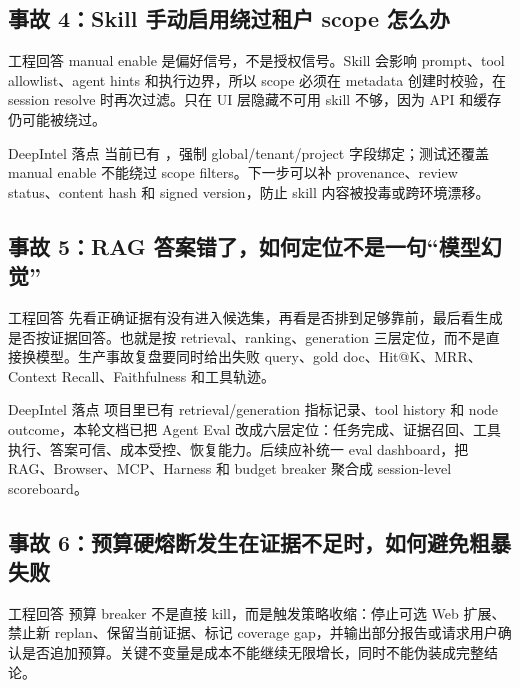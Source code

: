 \subsection{事故 4：Skill 手动启用绕过租户 scope 怎么办}
\begin{qaBox}{工程回答}
manual enable 是偏好信号，不是授权信号。Skill 会影响 prompt、tool allowlist、agent hints 和执行边界，所以 scope 必须在 metadata 创建时校验，在 session resolve 时再次过滤。只在 UI 层隐藏不可用 skill 不够，因为 API 和缓存仍可能被绕过。
\end{qaBox}

\begin{analysisBox}{DeepIntel 落点}
当前已有 ，强制 global/tenant/project 字段绑定；测试还覆盖 manual enable 不能绕过 scope filters。下一步可以补 provenance、review status、content hash 和 signed version，防止 skill 内容被投毒或跨环境漂移。
\end{analysisBox}

\subsection{事故 5：RAG 答案错了，如何定位不是一句“模型幻觉”}
\begin{qaBox}{工程回答}
先看正确证据有没有进入候选集，再看是否排到足够靠前，最后看生成是否按证据回答。也就是按 retrieval、ranking、generation 三层定位，而不是直接换模型。生产事故复盘要同时给出失败 query、gold doc、Hit@K、MRR、Context Recall、Faithfulness 和工具轨迹。
\end{qaBox}

\begin{analysisBox}{DeepIntel 落点}
项目里已有 retrieval/generation 指标记录、tool history 和 node outcome，本轮文档已把 Agent Eval 改成六层定位：任务完成、证据召回、工具执行、答案可信、成本受控、恢复能力。后续应补统一 eval dashboard，把 RAG、Browser、MCP、Harness 和 budget breaker 聚合成 session-level scoreboard。
\end{analysisBox}

\subsection{事故 6：预算硬熔断发生在证据不足时，如何避免粗暴失败}
\begin{qaBox}{工程回答}
预算 breaker 不是直接 kill，而是触发策略收缩：停止可选 Web 扩展、禁止新 replan、保留当前证据、标记 coverage gap，并输出部分报告或请求用户确认是否追加预算。关键不变量是成本不能继续无限增长，同时不能伪装成完整结论。
\end{qaBox}

